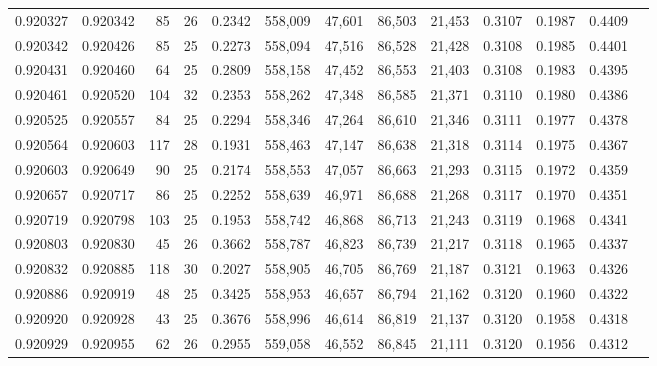 \begin{tabular}{rrrrrrrrrrrrr}
0.920327 & 0.920342 &    85 &  26 &                                     0.2342 & 558,009 &  47,601 &  86,503 &  21,453 & 0.3107 & 0.1987 & 0.4409 \\
0.920342 & 0.920426 &    85 &  25 &                                     0.2273 & 558,094 &  47,516 &  86,528 &  21,428 & 0.3108 & 0.1985 & 0.4401 \\
0.920431 & 0.920460 &    64 &  25 &                                     0.2809 & 558,158 &  47,452 &  86,553 &  21,403 & 0.3108 & 0.1983 & 0.4395 \\
0.920461 & 0.920520 &   104 &  32 &                                     0.2353 & 558,262 &  47,348 &  86,585 &  21,371 & 0.3110 & 0.1980 & 0.4386 \\
0.920525 & 0.920557 &    84 &  25 &                                     0.2294 & 558,346 &  47,264 &  86,610 &  21,346 & 0.3111 & 0.1977 & 0.4378 \\
0.920564 & 0.920603 &   117 &  28 &                                     0.1931 & 558,463 &  47,147 &  86,638 &  21,318 & 0.3114 & 0.1975 & 0.4367 \\
0.920603 & 0.920649 &    90 &  25 &                                     0.2174 & 558,553 &  47,057 &  86,663 &  21,293 & 0.3115 & 0.1972 & 0.4359 \\
0.920657 & 0.920717 &    86 &  25 &                                     0.2252 & 558,639 &  46,971 &  86,688 &  21,268 & 0.3117 & 0.1970 & 0.4351 \\
0.920719 & 0.920798 &   103 &  25 &                                     0.1953 & 558,742 &  46,868 &  86,713 &  21,243 & 0.3119 & 0.1968 & 0.4341 \\
0.920803 & 0.920830 &    45 &  26 &                                     0.3662 & 558,787 &  46,823 &  86,739 &  21,217 & 0.3118 & 0.1965 & 0.4337 \\
0.920832 & 0.920885 &   118 &  30 &                                     0.2027 & 558,905 &  46,705 &  86,769 &  21,187 & 0.3121 & 0.1963 & 0.4326 \\
0.920886 & 0.920919 &    48 &  25 &                                     0.3425 & 558,953 &  46,657 &  86,794 &  21,162 & 0.3120 & 0.1960 & 0.4322 \\
0.920920 & 0.920928 &    43 &  25 &                                     0.3676 & 558,996 &  46,614 &  86,819 &  21,137 & 0.3120 & 0.1958 & 0.4318 \\
0.920929 & 0.920955 &    62 &  26 &                                     0.2955 & 559,058 &  46,552 &  86,845 &  21,111 & 0.3120 & 0.1956 & 0.4312 \\

\end{tabular}
